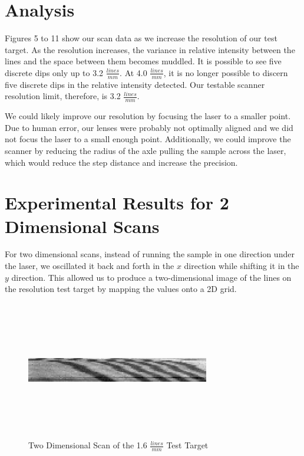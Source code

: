 \documentclass[letterpaper, 12pt]{article}
\begin{document}
\section{Analysis}
\par
Figures 5 to 11 show our scan data as we increase the resolution of our test target. As the resolution increases, the variance in relative intensity between the lines and the space between them becomes muddled. It is possible to see five discrete dips only up to 3.2 $\frac{lines}{mm}$. At 4.0 $\frac{lines}{mm}$, it is no longer possible to discern five discrete dips in the relative intensity detected. Our testable scanner resolution limit, therefore, is 3.2 $\frac{lines}{mm}$.
\par
We could likely improve our resolution by focusing the laser to a smaller point. Due to human error, our lenses were probably not optimally aligned and we did not focus the laser to a small enough point. Additionally, we could improve the scanner by reducing the radius of the axle pulling the sample across the laser, which would reduce the step distance and increase the precision.

\section{Experimental Results for 2 Dimensional Scans}
\par
For two dimensional scans, instead of running the sample in one direction under the laser, we oscillated it back and forth in the $x$ direction while shifting it in the $y$ direction. This allowed us to produce a two-dimensional image of the lines on the resolution test target by mapping the values onto a 2D grid.

\begin{figure}[H]
  \centering
  \includegraphics[width=8cm,height=6cm]{2d_scan_1}
  \caption[caption]{Two Dimensional Scan of the 1.6 $\frac{lines}{mm}$ Test Target}
\end{figure}
\end{document}
